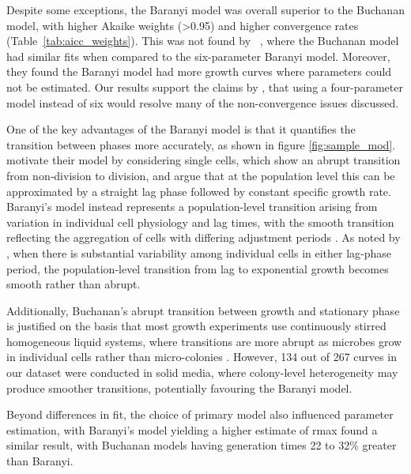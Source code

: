 \documentclass[11pt]{article}
\begin{document}
Despite some exceptions, the Baranyi model was overall superior to the Buchanan model, with 
higher Akaike weights (\textgreater 0.95) and higher convergence rates (Table~\ref{tab:aicc_weights}). 
This was not found by ~\cite{buchanan1997simple}, where the Buchanan model had 
similar fits when compared to the six-parameter Baranyi model. Moreover, they found the 
Baranyi model had more growth curves where parameters could not be estimated. Our results 
support the claims by \cite{baranyi1997simple}, that using a four-parameter model instead 
of six would resolve many of the non-convergence issues \cite{buchanan1997simple} discussed.

One of the key advantages of the Baranyi model is that it quantifies the transition 
between phases more accurately, as shown in figure \ref{fig:sample_mod}. 
\cite{buchanan1997simple} motivate their model by considering single cells, which show an 
abrupt transition from non‑division to division, and argue that at the population 
level this can be approximated by a straight lag phase followed by constant specific growth 
rate. Baranyi's model instead represents a population-level transition arising from variation 
in individual cell physiology and lag times, with the smooth transition reflecting the 
aggregation of cells with differing adjustment periods 
\citep{buchanan1997simple, baranyi1997simple}. As noted by \cite{buchanan1997simple}, when 
there is substantial variability among individual cells in either lag‑phase period, the 
population‑level transition from lag to exponential growth becomes smooth rather than abrupt.

Additionally, Buchanan's abrupt transition between growth and stationary phase is justified 
on the basis that most growth experiments use continuously stirred homogeneous liquid 
systems, where transitions are more abrupt as microbes grow in individual cells rather than micro-colonies \citep{buchanan1997simple}. However, 
134 out of 267 curves in our dataset were conducted in solid media, where colony-level 
heterogeneity may produce smoother transitions, potentially favouring the Baranyi model.

Beyond differences in fit, the choice of primary model also influenced parameter estimation, 
with Baranyi’s model yielding a higher estimate of rmax \cite{buchanan1997simple} 
found a similar result, with Buchanan models having generation times 22 to 32\% greater than Baranyi.
\end{document}
